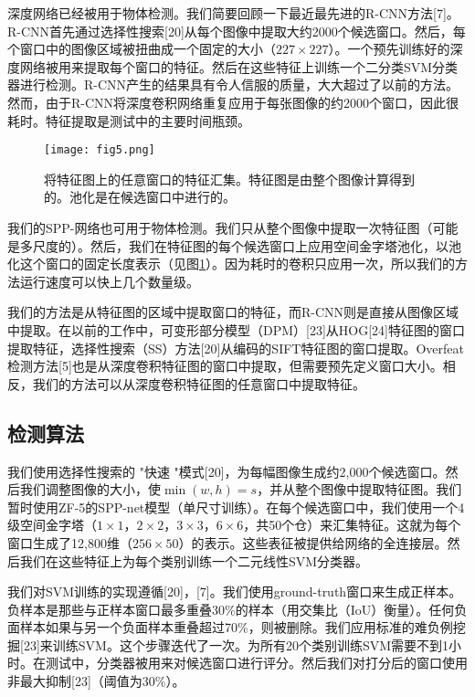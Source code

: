 \documentclass[../main.tex]{subfile}
\begin{document}
深度网络已经被用于物体检测。我们简要回顾一下最近最先进的R-CNN方法[7]。R-CNN首先通过选择性搜索[20]从每个图像中提取大约2000个候选窗口。然后，每个窗口中的图像区域被扭曲成一个固定的大小（$227\times 227$）。一个预先训练好的深度网络被用来提取每个窗口的特征。然后在这些特征上训练一个二分类SVM分类器进行检测。R-CNN产生的结果具有令人信服的质量，大大超过了以前的方法。然而，由于R-CNN将深度卷积网络重复应用于每张图像的约2000个窗口，因此很耗时。特征提取是测试中的主要时间瓶颈。

\begin{figure}[htb]
    \centering
    \texttt{[image: fig5.png]}
    \caption{将特征图上的任意窗口的特征汇集。特征图是由整个图像计算得到的。池化是在候选窗口中进行的。}
    \label{fig:fig5}
\end{figure}

我们的SPP-网络也可用于物体检测。我们只从整个图像中提取一次特征图（可能是多尺度的）。然后，我们在特征图的每个候选窗口上应用空间金字塔池化，以池化这个窗口的固定长度表示（见图\ref{fig:fig5}）。因为耗时的卷积只应用一次，所以我们的方法运行速度可以快上几个数量级。

我们的方法是从特征图的区域中提取窗口的特征，而R-CNN则是直接从图像区域中提取。在以前的工作中，可变形部分模型（DPM）[23]从HOG[24]特征图的窗口提取特征，选择性搜索（SS）方法[20]从编码的SIFT特征图的窗口提取。Overfeat检测方法[5]也是从深度卷积特征图的窗口中提取，但需要预先定义窗口大小。相反，我们的方法可以从深度卷积特征图的任意窗口中提取特征。

\subsection{检测算法}

我们使用选择性搜索的 "快速 "模式[20]，为每幅图像生成约2,000个候选窗口。然后我们调整图像的大小，使$\min\left(w, h\right) = s$，并从整个图像中提取特征图。我们暂时使用ZF-5的SPP-net模型（单尺寸训练）。在每个候选窗口中，我们使用一个4级空间金字塔（$1\times 1$，$2\times 2$，$3\times 3$，$6\times 6$，共50个仓）来汇集特征。这就为每个窗口生成了12,800维（$256\times 50$）的表示。这些表征被提供给网络的全连接层。然后我们在这些特征上为每个类别训练一个二元线性SVM分类器。

我们对SVM训练的实现遵循[20]，[7]。我们使用ground-truth窗口来生成正样本。负样本是那些与正样本窗口最多重叠30\%的样本（用交集比（IoU）衡量）。任何负面样本如果与另一个负面样本重叠超过70\%，则被删除。我们应用标准的难负例挖掘[23]来训练SVM。这个步骤迭代了一次。为所有20个类别训练SVM需要不到1小时。在测试中，分类器被用来对候选窗口进行评分。然后我们对打分后的窗口使用非最大抑制[23]（阈值为30\%）。
\end{document}
